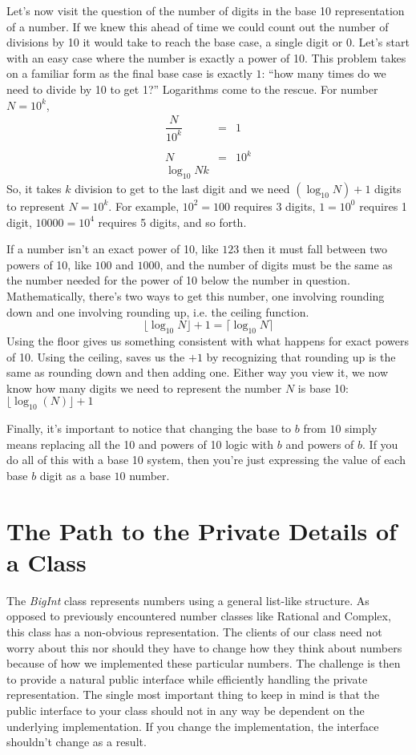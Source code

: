 \documentclass[10pt]{article}
\begin{document}
Let's now visit the question of the number of digits in the base 10 representation of a number. If we knew this ahead of time we could count out the number of divisions by 10 it would take to reach the base case, a single digit or 0. Let's start with an easy case where the number is exactly a power of 10. This problem takes on a familiar form as the final base case is exactly $1$:  ``how many times do we need to divide by 10 to get 1?'' Logarithms come to the rescue. For number $N = 10^k$, 
\[
\begin{array}{rcl}
\dfrac{N}{10^k} &=& 1 \\ \\
N &=& 10^k \\ 
\log_{10} N k
\end{array}
\]
So, it takes $k$ division to get to the last digit and we need $(\log_{10} N) + 1$ digits to represent $N = 10^k$.  For example, $10^2 = 100$ requires 3 digits, $1 = 10^0$ requires 1 digit, $10000 = 10^4$ requires 5 digits, and so forth. 

If a number isn't an exact power of 10, like $123$ then it must fall between two powers of 10, like $100$ and $1000$, and the number of digits must be the same as the number needed for the power of 10 below the number in question. Mathematically, there's two ways to get this number, one involving rounding down and one involving rounding up, i.e. the ceiling function. 
\[
\lfloor \log_{10} N \rfloor + 1  = \lceil \log_{10} N \rceil
\]
Using the floor gives us something consistent with what happens for exact powers of 10. Using the ceiling, saves us the $+1$ by recognizing that rounding up is the same as rounding down and then adding one. Either way you view it, we now know how many digits we need to represent the number $N$ is base 10: $\lfloor\log_{10}(N)\rfloor + 1$

Finally, it's important to notice that changing the base to $b$ from $10$ simply means replacing all the 10 and powers of 10 logic with $b$ and powers of $b$. If you do all of this with a base 10 system, then you're just expressing the value of each base $b$ digit as a base $10$ number. 

\section{The Path to the Private Details of a Class}

The \textit{BigInt} class represents numbers using a general list-like structure. As opposed to previously encountered number classes like Rational and Complex, this class has a non-obvious representation. The clients of our class need not worry about this nor should they have to change how they think about numbers because of how we implemented these particular numbers. The challenge is then to provide a natural public interface while efficiently handling the private representation. The single most important thing to keep in mind is that the public interface to your class should not in any way be dependent on the underlying implementation. If you change the implementation, the interface shouldn't change as a result. 
\end{document}
